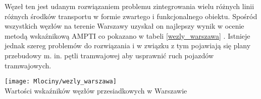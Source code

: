 \documentclass[twoside,12pt]{article}
\begin{document}
	Węzeł ten jest udanym rozwiązaniem problemu zintegrowania wielu różnych linii różnych środków transportu w formie zwartego i funkcjonalnego obiektu. Spośród wszystkich węzłów na terenie Warszawy uzyskał on najlepszy wynik w ocenie metodą wskaźnikową AMPTI co pokazano w tabeli \ref{wezly_warszawa} \cite{metodyka}. Istnieje jednak szereg problemów do rozwiązania i w związku z tym pojawiają się plany przebudowy m. in. pętli tramwajowej aby usprawnić ruch pojazdów tramwajowych. 
	
	\begin{table}[H]
		\centering
		\texttt{[image: Mlociny/wezly\_warszawa]}\\
		\caption{Wartości wskaźników węzłów przesiadkowych w Warszawie}
		\label{wezly_warszawa}
	\end{table}			


\clearpage

\end{document}
